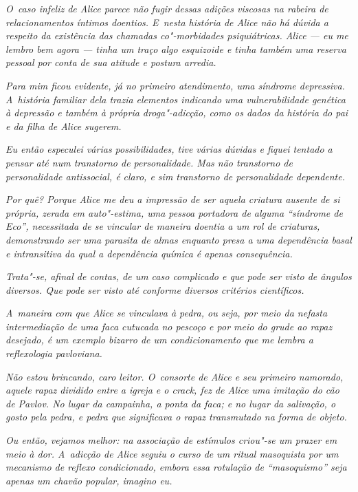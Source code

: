 \emph{O~caso infeliz de Alice parece não fugir dessas adições viscosas
na rabeira de relacionamentos íntimos doentios. E~nesta história de
Alice não há dúvida a respeito da existência das chamadas co"-morbidades
psiquiátricas. Alice --- eu me lembro bem agora --- tinha um traço algo
esquizoide e tinha também uma reserva pessoal por conta de sua atitude e
postura arredia.}~

\emph{Para mim ficou evidente, já no primeiro atendimento, uma síndrome
depressiva. A~história familiar dela trazia elementos indicando uma
vulnerabilidade genética à depressão e também à própria droga"-adicção,
como os dados da história do pai e da filha de Alice sugerem.}~

\emph{Eu então especulei várias possibilidades, tive várias dúvidas e
fiquei tentado a pensar até num transtorno de personalidade. Mas não
transtorno de personalidade antissocial, é claro, e sim transtorno de
personalidade dependente.}~

\emph{Por quê? Porque Alice me deu a impressão de ser aquela criatura
ausente de si própria, zerada em auto"-estima, uma pessoa portadora de
alguma ``síndrome de Eco'', necessitada de se vincular de maneira
doentia a um rol de criaturas, demonstrando ser uma parasita de almas
enquanto presa a uma dependência basal e intransitiva da qual a
dependência química é apenas consequência.}~

\emph{Trata"-se, afinal de contas, de um caso complicado e que pode ser
visto de ângulos diversos. Que pode ser visto até conforme diversos
critérios científicos.}~

\emph{A~maneira com que Alice se vinculava à pedra, ou seja, por meio da
nefasta intermediação de uma faca cutucada no pescoço e por meio do
grude ao rapaz desejado, é um exemplo bizarro de um condicionamento que
me lembra a reflexologia pavloviana.}~

\emph{Não estou brincando, caro leitor. O~consorte de Alice e seu
primeiro namorado, aquele rapaz dividido entre a igreja e o crack, fez
de Alice uma imitação do cão de Pavlov. No lugar da campainha, a ponta
da faca; e no lugar da salivação, o gosto pela pedra, e pedra que
significava o rapaz transmutado na forma de objeto.}~

\emph{Ou então, vejamos melhor: na associação de estímulos criou"-se um
prazer em meio à dor. A~adicção de Alice seguiu o curso de um ritual
masoquista por um mecanismo de reflexo condicionado, embora essa
rotulação de ``masoquismo'' seja apenas um chavão popular, imagino eu.}~


